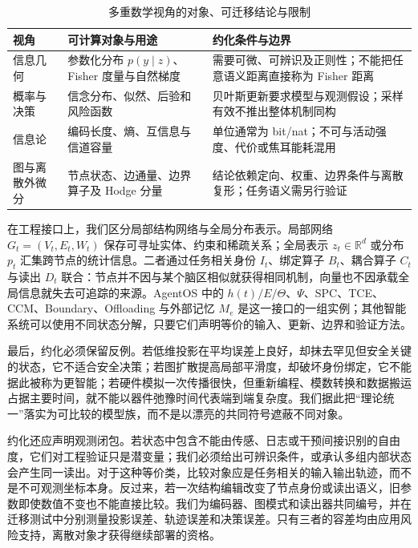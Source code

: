 \begin{table}[htbp]
\centering
\footnotesize
\caption{多重数学视角的对象、可迁移结论与限制}
\label{tab:reduction_lenses}
\begin{tabularx}{\textwidth}{l X X}
\toprule
\rowcolor{structurecolor!20} 视角 & 可计算对象与用途 & 约化条件与边界 \\
\midrule
信息几何 & 参数化分布 $p(y\mid z)$、Fisher 度量与自然梯度 & 需要可微、可辨识及正则性；不能把任意语义距离直接称为 Fisher 距离 \\
概率与决策 & 信念分布、似然、后验和风险函数 & 贝叶斯更新要求模型与观测假设；采样有效不推出整体机制同构 \\
信息论 & 编码长度、熵、互信息与信道容量 & 单位通常为 bit/nat；不可与活动强度、代价或焦耳能耗混用 \\
图与离散外微分 & 节点状态、边通量、边界算子及 Hodge 分量 & 结论依赖定向、权重、边界条件与离散复形；任务语义需另行验证 \\
\bottomrule
\end{tabularx}
\end{table}

在工程接口上，我们区分局部结构网络与全局分布表示。局部网络 $G_t=(V_t,E_t,W_t)$ 保存可寻址实体、约束和稀疏关系；全局表示 $z_t\in\mathbb R^d$ 或分布 $p_t$ 汇集跨节点的统计信息。二者通过任务相关身份 $I_t$、绑定算子 $B_t$、耦合算子 $C_t$ 与读出 $D_t$ 联合：节点并不因与某个脑区相似就获得相同机制，向量也不因承载全局信息就失去可追踪的来源。AgentOS 中的 $h(t)/E/\Theta$、$\Psi$、SPC、TCE、CCM、Boundary、Offloading 与外部记忆 $M_e$ 是这一接口的一组实例；其他智能系统可以使用不同状态分解，只要它们声明等价的输入、更新、边界和验证方法。

最后，约化必须保留反例。若低维投影在平均误差上良好，却抹去罕见但安全关键的状态，它不适合安全决策；若图扩散提高局部平滑度，却破坏身份绑定，它不能据此被称为更智能；若硬件模拟一次传播很快，但重新编程、模数转换和数据搬运占据主要时间，就不能以器件弛豫时间代表端到端复杂度。我们据此把“理论统一”落实为可比较的模型族，而不是以漂亮的共同符号遮蔽不同对象。

约化还应声明观测闭包。若状态中包含不能由传感、日志或干预间接识别的自由度，它们对工程验证只是潜变量；我们必须给出可辨识条件，或承认多组内部状态会产生同一读出。对于这种等价类，比较对象应是任务相关的输入输出轨迹，而不是不可观测坐标本身。反过来，若一次结构编辑改变了节点身份或读出语义，旧参数即使数值不变也不能直接比较。我们为编码器、图模式和读出器共同编号，并在迁移测试中分别测量投影误差、轨迹误差和决策误差。只有三者的容差均由应用风险支持，离散对象才获得继续部署的资格。

